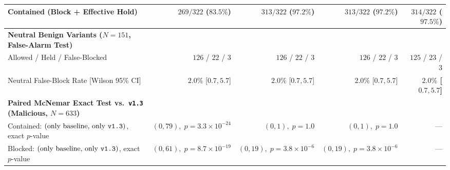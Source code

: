 \documentclass[10pt,twocolumn,letterpaper]{article}
\makeatletter
\theoremstyle{plain}
\theoremstyle{definition}
\theoremstyle{remark}
\DeclareRobustCommand{\_}{\ifmmode\nfss@text{\textunderscore}\else\textunderscore\penalty\@highpenalty\hskip\z@skip\fi}
\makeatother
\begin{document}
\begin{table}[!t]
{\begin{tabular}{@{}lrrrr@{}}
    \quad Contained (Block + Effective Hold) & $269/322$ ($83.5\%$) & $313/322$ ($97.2\%$) & $313/322$ ($97.2\%$) & \textbf{$314/322$ ($97.5\%$)} \\
    \midrule
    \textbf{Neutral Benign Variants ($N = 151$, False-Alarm Test)} & & & & \\
    \quad Allowed / Held / False-Blocked & $126$ / $22$ / $3$ & $126$ / $22$ / $3$ & $126$ / $22$ / $3$ & $125$ / $23$ / $3$ \\
    \quad Neutral False-Block Rate [Wilson 95\% CI] & $2.0\%$ [$0.7, 5.7$] & $2.0\%$ [$0.7, 5.7$] & $2.0\%$ [$0.7, 5.7$] & \textbf{$2.0\%$ [$0.7, 5.7$]} \\
    \midrule
    \textbf{Paired McNemar Exact Test vs.\ \texttt{v1.3} (Malicious, $N = 633$)} & & & & \\
    \quad Contained: $(\text{only baseline},\, \text{only \texttt{v1.3}})$, exact $p$-value & $(0, 79),\; p = 3.3\!\times\!10^{-24}$ & $(0, 1),\; p = 1.0$ & $(0, 1),\; p = 1.0$ & --- \\
    \quad Blocked: $(\text{only baseline},\, \text{only \texttt{v1.3}})$, exact $p$-value & $(0, 61),\; p = 8.7\!\times\!10^{-19}$ & $(0, 19),\; p = 3.8\!\times\!10^{-6}$ & $(0, 19),\; p = 3.8\!\times\!10^{-6}$ & --- \\
    \bottomrule
  \end{tabular}}
\end{table}
\end{document}
